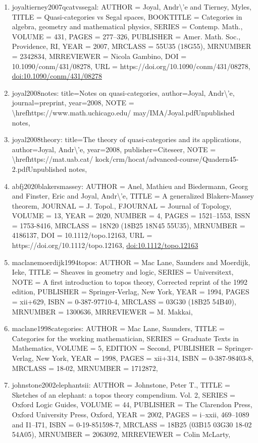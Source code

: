 \documentclass[11pt]{article}
\begin{document}
\begin{enumerate}[leftmargin=*]
  \item joyaltierney2007qcatvssegal: AUTHOR = Joyal, Andr\textbackslash{}'e and Tierney, Myles, TITLE = Quasi-categories vs Segal spaces, BOOKTITLE = Categories in algebra, geometry and mathematical physics, SERIES = Contemp. Math., VOLUME = 431, PAGES = 277--326, PUBLISHER = Amer. Math. Soc., Providence, RI, YEAR = 2007, MRCLASS = 55U35 (18G55), MRNUMBER = 2342834, MRREVIEWER = Nicola Gambino, DOI = 10.1090/conm/431/08278, URL = https://doi.org/10.1090/conm/431/08278, \href{https://doi.org/10.1090/conm/431/08278}{doi:10.1090/conm/431/08278}
  \item joyal2008notes: title=Notes on quasi-categories, author=Joyal, Andr\textbackslash{}'e, journal=preprint, year=2008, NOTE = \textbackslash{}hrefhttps://www.math.uchicago.edu/ may/IMA/Joyal.pdfUnpublished notes,
  \item joyal2008theory: title=The theory of quasi-categories and its applications, author=Joyal, Andr\textbackslash{}'e, year=2008, publisher=Citeseer, NOTE = \textbackslash{}hrefhttps://mat.uab.cat/ kock/crm/hocat/advanced-course/Quadern45-2.pdfUnpublished notes,
  \item abfj2020blakersmassey: AUTHOR = Anel, Mathieu and Biedermann, Georg and Finster, Eric and Joyal, Andr\textbackslash{}'e, TITLE = A generalized Blakers-Massey theorem, JOURNAL = J. Topol., FJOURNAL = Journal of Topology, VOLUME = 13, YEAR = 2020, NUMBER = 4, PAGES = 1521--1553, ISSN = 1753-8416, MRCLASS = 18N20 (18B25 18N45 55U35), MRNUMBER = 4186137, DOI = 10.1112/topo.12163, URL = https://doi.org/10.1112/topo.12163, \href{https://doi.org/10.1112/topo.12163}{doi:10.1112/topo.12163}
  \item maclanemoerdijk1994topos: AUTHOR = Mac Lane, Saunders and Moerdijk, Ieke, TITLE = Sheaves in geometry and logic, SERIES = Universitext, NOTE = A first introduction to topos theory, Corrected reprint of the 1992 edition, PUBLISHER = Springer-Verlag, New York, YEAR = 1994, PAGES = xii+629, ISBN = 0-387-97710-4, MRCLASS = 03G30 (18B25 54B40), MRNUMBER = 1300636, MRREVIEWER = M. Makkai,
  \item maclane1998categories: AUTHOR = Mac Lane, Saunders, TITLE = Categories for the working mathematician, SERIES = Graduate Texts in Mathematics, VOLUME = 5, EDITION = Second, PUBLISHER = Springer-Verlag, New York, YEAR = 1998, PAGES = xii+314, ISBN = 0-387-98403-8, MRCLASS = 18-02, MRNUMBER = 1712872,
  \item johnstone2002elephantsii: AUTHOR = Johnstone, Peter T., TITLE = Sketches of an elephant: a topos theory compendium. Vol. 2, SERIES = Oxford Logic Guides, VOLUME = 44, PUBLISHER = The Clarendon Press, Oxford University Press, Oxford, YEAR = 2002, PAGES = i--xxii, 469--1089 and I1--I71, ISBN = 0-19-851598-7, MRCLASS = 18B25 (03B15 03G30 18-02 54A05), MRNUMBER = 2063092, MRREVIEWER = Colin McLarty,

\end{enumerate}
\end{document}
